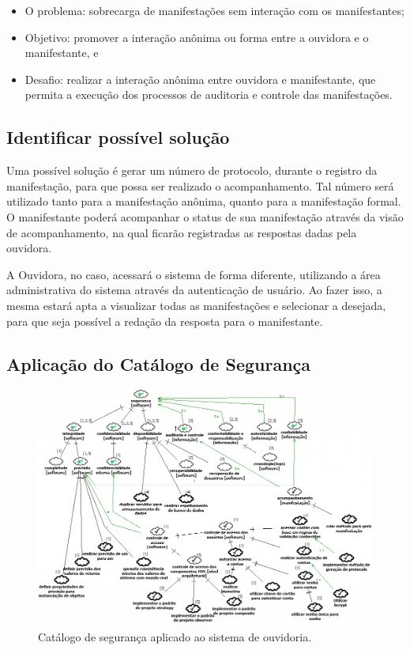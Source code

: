 \begin{itemize}
	\item O problema: sobrecarga de manifestações sem interação com os manifestantes; 
	\item Objetivo: promover a interação anônima ou forma entre a ouvidora e o manifestante, e
	\item Desafio: realizar a interação anônima entre ouvidora e manifestante, que permita a execução dos processos de auditoria e controle das manifestações.
\end{itemize}

\subsection{Identificar possível solução}

Uma possível solução é gerar um número de protocolo, durante o registro da manifestação, para que possa ser realizado o acompanhamento. Tal número será utilizado tanto para a manifestação anônima, quanto para a manifestação formal. O manifestante poderá acompanhar o status de sua manifestação através da visão de acompanhamento, na qual ficarão registradas as respostas dadas pela ouvidora.

A Ouvidora, no caso, acessará o sistema de forma diferente, utilizando a área administrativa do sistema através da autenticação de usuário. Ao fazer isso, a mesma estará apta a visualizar todas as manifestações e selecionar a desejada, para que seja possível a redação da resposta para o manifestante.  

\subsection{Aplicação do Catálogo de Segurança}

\begin{figure}[h!]
	\centering
	\includegraphics[keepaspectratio=true,scale=0.65]{figuras/catalogoPersona2.PNG}
	\caption{Catálogo de segurança aplicado ao sistema de ouvidoria.}
	\label{catalogoPersona2}
\end{figure}



